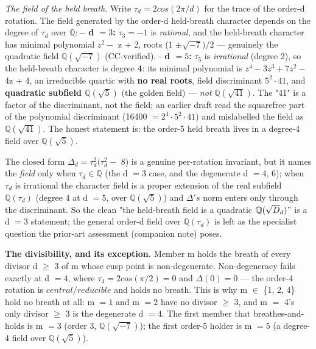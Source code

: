 \documentclass[11pt]{article}
\theoremstyle{plain}
\theoremstyle{definition}
\theoremstyle{remark}
\begin{document}
\emph{The field of the held breath.} Write \(\tau _{d} = 2cos(2\pi /d)\) for the trace of the order-d rotation. The field generated by the order-d held-breath character depends on the degree of \(\tau _{d}\) over \(\mathbb{Q}: -\) \textbf{d \(= 3\):} \(\tau _{3} = -1\) is \emph{rational}, and the held-breath character has minimal polynomial \(z^{2} -\) z + 2, roots (1 \(\pm  \sqrt{-7})/2\) — genuinely the quadratic field \textbf{\(\mathbb{Q}(\sqrt{-7})\)} (CC-verified). - \textbf{d \(= 5\):} \(\tau _{5}\) is \emph{irrational} (degree 2), so the held-breath character is degree \textbf{4}: its minimal polynomial is \(z^{4} - 3z^{3} + 7z^{2} -\) 4z + 4, an irreducible quartic with \textbf{no real roots}, field discriminant \(5^{2}\cdot 41\), and \textbf{quadratic subfield \(\mathbb{Q}(\sqrt{5})\)} (the golden field) — \emph{not} \(\mathbb{Q}(\sqrt{41})\). The "41" is a factor of the discriminant, not the field; an earlier draft read the squarefree part of the polynomial discriminant (16400 \(= 2^{4}\cdot 5^{2}\cdot 41\)) and mislabelled the field as \(\mathbb{Q}(\sqrt{41})\). The honest statement is: the order-5 held breath lives in a degree-4 field over \(\mathbb{Q}(\sqrt{5})\).

The closed form \(\Delta _{d} = \tau _{d}^{2}(\tau _{d}^{2} -\) 8) is a genuine per-rotation invariant, but it names the \emph{field} only when \(\tau _{d} \in  \mathbb{Q}\) (the d \(= 3\) case, and the degenerate d \(= 4\), 6); when \(\tau _{d}\) is irrational the character field is a proper extension of the real subfield \(\mathbb{Q}(\tau _{d})\) (degree 4 at d \(= 5\), over \(\mathbb{Q}(\sqrt{5})\)) and \(\Delta 's\) norm enters only through the discriminant. So the clean "the held-breath field is a quadratic \(\mathbb{Q}(\sqrt{D}_{d})"\) is a d \(= 3\) statement; the general order-d field over \(\mathbb{Q}(\tau _{d})\) is left as the specialist question the prior-art assessment (companion note) poses.

\textbf{The divisibility, and its exception.} Member m holds the breath of every divisor d \(\ge \) 3 of m whose cusp point is non-degenerate. Non-degeneracy fails exactly at d \(= 4\), where \(\tau _{4} = 2cos(\pi /2) = 0\) and \(\Delta (0) = 0\) — the order-4 rotation is \(central/reducible\) and holds no breath. This is why m \(\in \) \{1, 2, 4\} hold no breath at all: m \(= 1\) and m \(= 2\) have no divisor \(\ge \) 3, and m \(=\) 4's only divisor \(\ge \) 3 is the degenerate d \(= 4\). The first member that breathes-and-holds is m \(= 3\) (order 3, \(\mathbb{Q}(\sqrt{-7})\)); the first order-5 holder is m \(= 5\) (a degree-4 field over \(\mathbb{Q}(\sqrt{5})\)).
\end{document}
